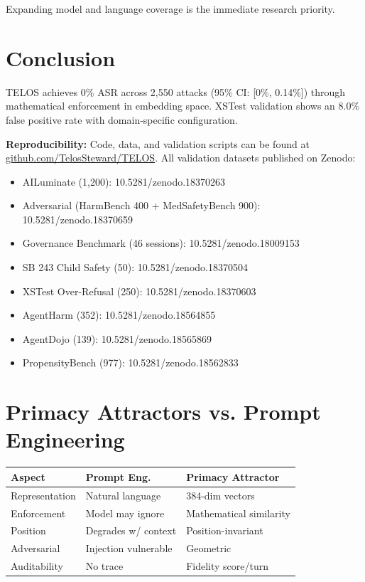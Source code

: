 \documentclass[11pt,twocolumn]{article}
\begin{document}
Expanding model and language coverage is the immediate research priority.

\section{Conclusion}

TELOS achieves 0\% ASR across 2,550 attacks (95\% CI: [0\%, 0.14\%]) through mathematical enforcement in embedding space. XSTest validation shows an 8.0\% false positive rate with domain-specific configuration.

\textbf{Reproducibility:} Code, data, and validation scripts can be found at \url{github.com/TelosSteward/TELOS}. All validation datasets published on Zenodo:
\begin{itemize}
    \item AILuminate (1,200): 10.5281/zenodo.18370263
    \item Adversarial (HarmBench 400 + MedSafetyBench 900): 10.5281/zenodo.18370659
    \item Governance Benchmark (46 sessions): 10.5281/zenodo.18009153
    \item SB 243 Child Safety (50): 10.5281/zenodo.18370504
    \item XSTest Over-Refusal (250): 10.5281/zenodo.18370603
    \item AgentHarm (352): 10.5281/zenodo.18564855
    \item AgentDojo (139): 10.5281/zenodo.18565869
    \item PropensityBench (977): 10.5281/zenodo.18562833
\end{itemize}

\appendix
\section{Primacy Attractors vs. Prompt Engineering}

\begin{table}[h]
\centering
\small
\begin{tabular}{@{}lp{2cm}p{2.5cm}@{}}
\toprule
\textbf{Aspect} & \textbf{Prompt Eng.} & \textbf{Primacy Attractor} \\
\midrule
Representation & Natural language & 384-dim vectors \\
Enforcement & Model may ignore & Mathematical similarity \\
Position & Degrades w/ context & Position-invariant \\
Adversarial & Injection vulnerable & Geometric \\
Auditability & No trace & Fidelity score/turn \\
\bottomrule
\end{tabular}
\end{table}
\end{document}
